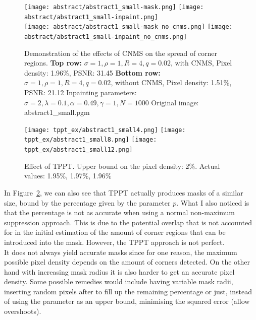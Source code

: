 \begin{figure}[h]
    \centering
    \texttt{[image: abstract/abstract1\_small-mask.png]}\hspace{0.2cm}
    \texttt{[image: abstract/abstract1\_small-inpaint.png]}\\
    \vspace*{0.2cm}
    \texttt{[image: abstract/abstract1\_small-mask\_no\_cnms.png]}\hspace{0.2cm}
    \texttt{[image: abstract/abstract1\_small-inpaint\_no\_cnms.png]}\\
    \caption{Demonstration of the effects of CNMS on the spread of corner regions.
\textbf{Top row:} $\sigma=1,\rho=1,R=4,q=0.02$, with CNMS, Pixel density: 1.96\%, PSNR\@:
31.45
\textbf{Bottom row:} $\sigma=1,\rho=1,R=4,q=0.02$, without CNMS, Pixel density:
1.51\%, PSNR\@: 21.12
Inpainting parameters: $\sigma=2,\lambda=0.1,\alpha=0.49,\gamma=1,N=1000$
Original image: abstract1\_small.pgm }\label{fig:AbstractCNMSExamples}
\end{figure}
\begin{figure}[ht]
    \centering
    \texttt{[image: tppt\_ex/abstract1\_small4.png]}
    \texttt{[image: tppt\_ex/abstract1\_small8.png]}
    \texttt{[image: tppt\_ex/abstract1\_small12.png]}
    \caption{Effect of TPPT\@. Upper bound on the pixel density: 2\%. Actual values:
    1.95\%, 1.97\%, 1.96\%}\label{fig:TPPTEx}
\end{figure}
In Figure~\ref{fig:TPPTEx}, we can also see that TPPT actually produces masks of a
similar size, bound by the percentage given by the parameter $p$. What I also noticed is that the
percentage is not as accurate when using a normal non-maximum suppression approach. This is due to
the potential overlap that is not accounted for in the initial estimation of the amount of corner
regions that can be introduced into the mask.
However, the TPPT approach is not perfect.\\
It does not always yield accurate masks since for one
reason, the maximum possible pixel density depends on the amount of corners detected. On the other
hand with increasing mask radius it is also harder to get an accurate pixel density. Some possible
remedies would include having variable mask radii, inserting random pixels after to fill up the
remaining percentage or just, instead of using the parameter as an upper bound, minimising the
squared error (allow overshoots).
\newpage\noindent
